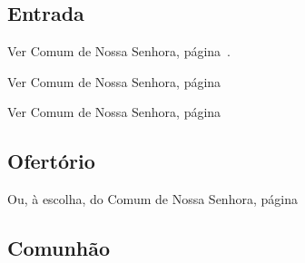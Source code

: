 
\subsection{Entrada}\label{subsection:proprium-sanctorum/in-conceptione-immaculata-bmv/introitus}

\AllowPageFlush

\begin{rubrica}
  Ver Comum de Nossa Senhora, página~\pageref{subsection:communia/commune-bmv/psalmus-responsorius}.
\end{rubrica}

\begin{rubrica}
  Ver Comum de Nossa Senhora, página~\pageref{subsection:communia/commune-bmv/alleluia}
\end{rubrica}

\begin{rubrica}
  Ver Comum de Nossa Senhora, página~\pageref{subsection:communia/commune-bmv/psalmus-alleluiaticus}
\end{rubrica}

\AllowPageFlush

\subsection{Ofertório}\label{subsection:proprium-sanctorum/in-conceptione-immaculata-bmv/offertorium}

\begin{rubrica}
  Ou, à escolha, do Comum de Nossa Senhora, página~\pageref{subsection:communia/commune-bmv/offertorium}
\end{rubrica}

\AllowPageFlush

\subsection{Comunhão}\label{subsection:proprium-sanctorum/in-conceptione-immaculata-bmv/communio}
